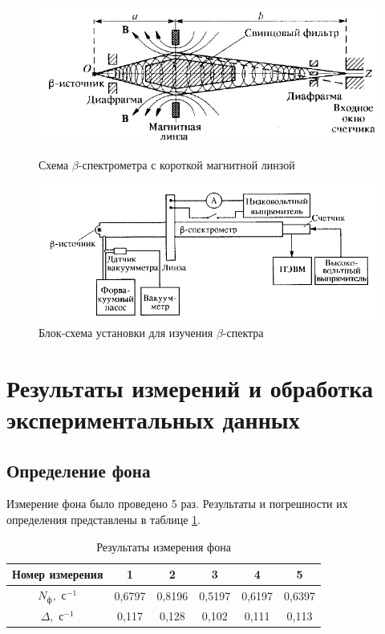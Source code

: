\documentclass[a4paper,12pt]{article} %
\begin{document}
\begin{figure}[h]
\begin{center}
\begin{minipage}[h]{0.48\linewidth}
\includegraphics[width=1\linewidth]{lens.PNG}
\caption{Схема $\beta$-спектрометра с короткой магнитной линзой} %
\label{ris:experimoriginal}
\end{minipage}
\hfill 
\begin{minipage}[h]{0.48\linewidth}
\includegraphics[width=1\linewidth]{setup.PNG}
\caption{Блок-схема установки для изучения $\beta$-спектра}
\label{ris:experimcoded}
\end{minipage}
\end{center}
\end{figure}

\section{Результаты измерений и обработка экспериментальных данных}
\subsection{Определение фона}
Измерение фона было проведено 5 раз. Результаты и погрешности их определения представлены в таблице \ref{tab:background}.
\begin{table}[h]
    \centering
    \begin{tabular}{|c|c|c|c|c|c|} \hline
        Номер измерения & 1 & 2 & 3 & 4 & 5 \\ \hline
        $N_\text{ф},\text{ с}^{-1}$ & 0,6797 & 0,8196 & 0,5197 & 0,6197 & 0,6397 \\ \hline
        $\Delta,\text{ с}^{-1}$ & 0,117 & 0,128 & 0,102 & 0,111 & 0,113 \\ \hline
    \end{tabular}
    \caption{Результаты измерения фона}
    \label{tab:background}
\end{table}
\end{document}
